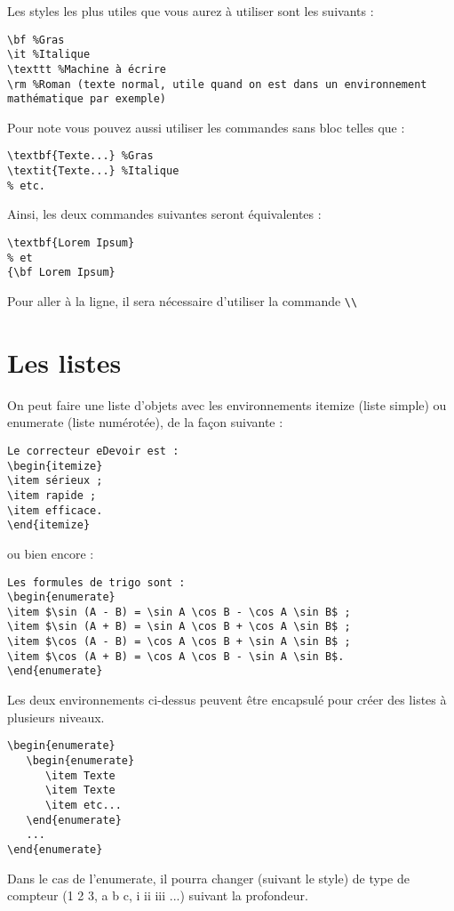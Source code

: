 Les styles les plus utiles que vous aurez à utiliser sont les suivants :
\begin{verbatim}
\bf %Gras
\it %Italique
\texttt %Machine à écrire
\rm %Roman (texte normal, utile quand on est dans un environnement mathématique par exemple)
\end{verbatim}

Pour note vous pouvez aussi utiliser les commandes sans bloc telles que :
\begin{verbatim}
\textbf{Texte...} %Gras
\textit{Texte...} %Italique
% etc.
\end{verbatim}

Ainsi, les deux commandes suivantes seront équivalentes :
\begin{verbatim}
\textbf{Lorem Ipsum}
% et
{\bf Lorem Ipsum}
\end{verbatim}

Pour aller à la ligne, il sera nécessaire d'utiliser la commande \verb?\\?

\section{Les listes}
On peut faire une liste d'objets avec les environnements itemize (liste simple) ou enumerate (liste numérotée), de la façon suivante :
\begin{verbatim}
Le correcteur eDevoir est :
\begin{itemize}
\item sérieux ;
\item rapide ;
\item efficace.
\end{itemize}
\end{verbatim}
ou bien encore :
\begin{verbatim}
Les formules de trigo sont :
\begin{enumerate}
\item $\sin (A - B) = \sin A \cos B - \cos A \sin B$ ;
\item $\sin (A + B) = \sin A \cos B + \cos A \sin B$ ;
\item $\cos (A - B) = \cos A \cos B + \sin A \sin B$ ;
\item $\cos (A + B) = \cos A \cos B - \sin A \sin B$.
\end{enumerate}
\end{verbatim}

Les deux environnements ci-dessus peuvent être encapsulé pour créer des listes à plusieurs niveaux.
\begin{verbatim}
\begin{enumerate}
   \begin{enumerate}
      \item Texte
      \item Texte
      \item etc...
   \end{enumerate}
   ...
\end{enumerate}
\end{verbatim}
Dans le cas de l'enumerate, il pourra changer (suivant le style) de type de compteur (1 2 3, a b c, i ii iii ...) suivant la profondeur.

